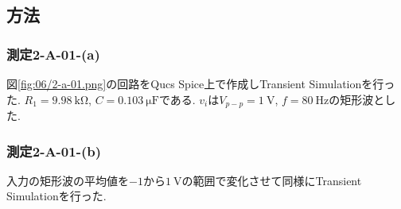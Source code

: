 \subsection{方法}
\subsubsection{測定2-A-01-(a)}
図\ref{fig:06/2-a-01.png}の回路をQucs Spice上で作成しTransient Simulationを行った.
$R_1=9.98\ \si{\kilo\ohm}$, $C=0.103\ \si{\micro\farad}$である.
$v_i$は$V_{p-p}=1\ \si{\volt}$, $f=80\ \si{\hertz}$の矩形波とした.
\subsubsection{測定2-A-01-(b)}
入力の矩形波の平均値を$-1$から$1\ \si{\volt}$の範囲で変化させて同様にTransient Simulationを行った.